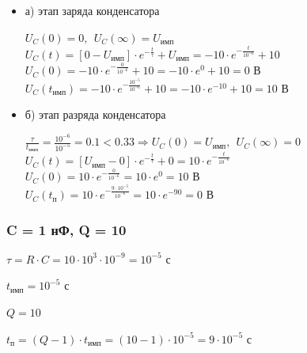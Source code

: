 \documentclass[a4paper,14pt]{extarticle}
\begin{document}
\begin{itemize}
\item[] а) этап заряда конденсатора

	$U_C(0) = 0,\ \ U_C(\infty) = U_\text{имп}$\\
	$U_C(t) = [0 - U_\text{имп}] \cdot e^{-\frac{t}{\tau}} + U_\text{имп} = -10 \cdot e^{-\frac{t}{10^{-6}}} + 10$\\
	$U_C(0) = -10 \cdot e^{-\frac{0}{10^{-6}}} + 10 = -10 \cdot e^0 + 10 = 0 \text{ В}$\\
	$U_C(t_\text{имп}) = -10 \cdot e^{-\frac{10^{-5}}{10^{-6}}} + 10 = -10 \cdot e^{-10} + 10 = 10 \text{ В}$

\item[] б) этап разряда конденсатора
	
	$\frac{\tau}{t_\text{имп}} = \frac{10^{-6}}{10^{-5}} = 0.1 < 0.33 \Rightarrow U_C(0) = U_\text{имп},\ \ U_C(\infty) = 0$\\
	$U_C(t) = [U_\text{имп} - 0] \cdot e^{-\frac{t}{\tau}} + 0 = 10 \cdot e^{-\frac{t}{10^{-6}}}$\\
	$U_C(0) = 10 \cdot e^{-\frac{0}{10^{-6}}} = 10 \cdot e^0 = 10 \text{ В}$\\
	$U_C(t_\text{п}) = 10 \cdot e^{-\frac{9 \cdot 10^{-5}}{10^{-6}}} = 10 \cdot e^{-90} = 0 \text{ В}$
\end{itemize}

\subsubsection{C = 1 нФ, Q = 10}

$\tau = R \cdot C = 10 \cdot 10^3 \cdot 10^{-9} = 10^{-5} \text{ с}$

$t_\text{имп} = 10^{-5} \text{ с}$

$Q = 10$		

$t_\text{п} = (Q - 1) \cdot t_\text{имп} = (10 - 1) \cdot 10^{-5} = 9 \cdot 10^{-5} \text{ с}$
\end{document}
